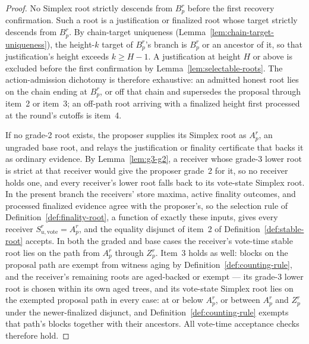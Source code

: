 \begin{proof}
No Simplex root strictly descends from \(B_p^r\) before the first recovery
confirmation.  Such a root is a justification or finalized root whose
target strictly descends from \(B_p^r\).  By chain-target uniqueness
(Lemma~\ref{lem:chain-target-uniqueness}), the height-\(k\) target of
\(B_p^r\)'s branch is \(B_p^r\) or an ancestor of it, so that justification's
height exceeds \(k\geq H-1\).  A justification at height \(H\) or
above is excluded before the first confirmation by
Lemma~\ref{lem:selectable-roots}.
The action-admission dichotomy is therefore exhaustive: an admitted honest
root lies on the chain ending at \(B_p^r\), or off that chain and
supersedes the proposal through item~2 or item~3; an off-path root
arriving with a finalized height first processed at the round's cutoffs
is item~4.

If no grade-2 root exists, the proposer supplies its Simplex root as
\(A_p^r\), an ungraded base root, and relays the justification or
finality certificate that backs it as ordinary evidence.  By
Lemma~\ref{lem:g3-g2}, a receiver whose grade-3 lower root is strict at
that receiver would give the proposer grade~2 for it, so no receiver
holds one, and every
receiver's lower root falls back to its vote-state Simplex root.  In the
present branch the receivers' store maxima, active finality outcomes, and
processed finalized evidence agree with the proposer's, so the selection
rule of Definition~\ref{def:finality-root}, a function of exactly these
inputs, gives every receiver
\(S_{u,\mathrm{vote}}^r=A_p^r\), and the equality disjunct of item~2 of
Definition~\ref{def:stable-root} accepts.  In both the graded and base
cases the receiver's vote-time stable root lies
on the path from \(A_p^r\) through \(Z_p^r\).  Item~3 holds as well:
blocks on the proposal path are exempt from witness aging by
Definition~\ref{def:counting-rule}, and the receiver's remaining
roots are aged-backed or exempt --- its grade-3 lower root is chosen
within its own aged trees, and its vote-state Simplex root lies on the
exempted proposal path in every case: at or below \(A_p^r\), or
between \(A_p^r\) and \(Z_p^r\) under the newer-finalized disjunct,
and Definition~\ref{def:counting-rule} exempts that path's blocks
together with their ancestors.  All vote-time
acceptance checks therefore hold.


\end{proof}
